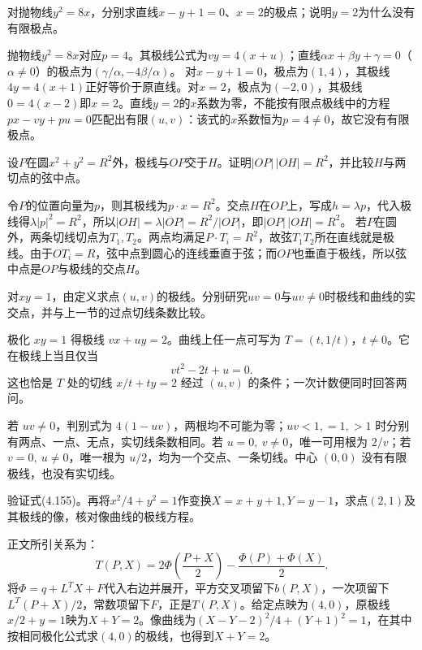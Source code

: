 对抛物线\(y^2=8x\)，分别求直线\(x-y+1=0\)、\(x=2\)的极点；说明\(y=2\)为什么没有有限极点。
\par
\solutionanswer
抛物线\(y^2=8x\)对应\(p=4\)。其极线公式为\(vy=4(x+u)\)；直线\(\alpha x+\beta y+\gamma=0\)（\(\alpha\ne0\)）的极点为\((\gamma/\alpha,-4\beta/\alpha)\)。
对\(x-y+1=0\)，极点为\((1,4)\)，其极线\(4y=4(x+1)\)正好等价于原直线。对\(x=2\)，极点为\((-2,0)\)，其极线\(0=4(x-2)\)即\(x=2\)。直线\(y=2\)的\(x\)系数为零，不能按有限点极线中的方程\(p x-vy+pu=0\)匹配出有限\((u,v)\)：该式的\(x\)系数恒为\(p=4\ne0\)，故它没有有限极点。


设\(P\)在圆\(x^2+y^2=R^2\)外，极线与\(OP\)交于\(H\)。证明\(|OP|\,|OH|=R^2\)，并比较\(H\)与两切点的弦中点。
\par
\solutionanswer
令\(P\)的位置向量为\(p\)，则其极线为\(p\cdot x=R^2\)。交点\(H\)在\(OP\)上，写成\(h=\lambda p\)，代入极线得\(\lambda|p|^2=R^2\)，所以\(|OH|=\lambda|OP|=R^2/|OP|\)，即\(|OP|\,|OH|=R^2\)。
若\(P\)在圆外，两条切线切点为\(T_1,T_2\)。两点均满足\(P\cdot T_i=R^2\)，故弦\(T_1T_2\)所在直线就是极线。由于\(OT_i=R\)，弦中点到圆心的连线垂直于弦；而\(OP\)也垂直于极线，所以弦中点是\(OP\)与极线的交点\(H\)。


对\(xy=1\)，由定义求点\((u,v)\)的极线。分别研究\(uv=0\)与\(uv\ne0\)时极线和曲线的实交点，并与上一节的过点切线条数比较。
\par
\solutionanswer
极化 \(xy=1\) 得极线 \(vx+uy=2\)。曲线上任一点可写为 \(T=(t,1/t)\)，\(t\ne0\)。它在极线上当且仅当
\[
    vt^2-2t+u=0.
\]
这也恰是 \(T\) 处的切线 \(x/t+ty=2\) 经过 \((u,v)\) 的条件；一次计数便同时回答两问。

若 \(uv\ne0\)，判别式为 \(4(1-uv)\)，两根均不可能为零；\(uv<1,=1,>1\) 时分别有两点、一点、无点，实切线条数相同。若 \(u=0,\ v\ne0\)，唯一可用根为 \(2/v\)；若 \(v=0,\ u\ne0\)，唯一根为 \(u/2\)，均为一个交点、一条切线。中心 \((0,0)\) 没有有限极线，也没有实切线。


验证式\textup{(4.155)}。再将\(x^2/4+y^2=1\)作变换\(X=x+y+1,Y=y-1\)，求点\((2,1)\)及其极线的像，核对像曲线的极线方程。
\par

\par\smallskip\noindent 正文所引关系为：
\begin{equation*}
T(P,X)=2\Phi\left(\frac{P+X}{2}\right)
       -\frac{\Phi(P)+\Phi(X)}{2}.
\end{equation*}
\solutionanswer
将\(\Phi=q+L^TX+F\)代入右边并展开，平方交叉项留下\(b(P,X)\)，一次项留下\(L^T(P+X)/2\)，常数项留下\(F\)，正是\(T(P,X)\)。给定点映为\((4,0)\)，原极线\(x/2+y=1\)映为\(X+Y=2\)。像曲线为\((X-Y-2)^2/4+(Y+1)^2=1\)，在其中按相同极化公式求\((4,0)\)的极线，也得到\(X+Y=2\)。



